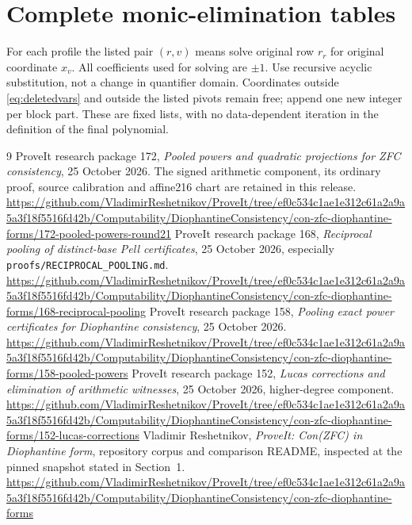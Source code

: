 \documentclass[10pt,letterpaper]{article}
\theoremstyle{remark}\newtheorem{remark}[theorem]{Remark}
\begin{document}
\section{Complete monic-elimination tables}\label{app:pivots}
For each profile the listed pair $(r,v)$ means solve original row $r_r$
for original coordinate $x_v$. All coefficients used for solving are
$\pm1$. Use recursive acyclic substitution, not a change in quantifier
domain. Coordinates outside \eqref{eq:deletedvars} and outside the
listed pivots remain free; append one new integer per block part.
These are fixed lists, with no data-dependent iteration in the
definition of the final polynomial.


\begin{thebibliography}{9}
 ProveIt research package 172,
\emph{Pooled powers and quadratic projections for ZFC consistency},
25 October 2026. The signed arithmetic component, its ordinary proof,
source calibration and affine216 chart are retained in this release.
\url{https://github.com/VladimirReshetnikov/ProveIt/tree/ef0c534c1ae1e312c61a2a9a5a3f18f5516fd42b/Computability/DiophantineConsistency/con-zfc-diophantine-forms/172-pooled-powers-round21}
 ProveIt research package 168,
\emph{Reciprocal pooling of distinct-base Pell certificates},
25 October 2026, especially \texttt{proofs/RECIPROCAL\_POOLING.md}.
\url{https://github.com/VladimirReshetnikov/ProveIt/tree/ef0c534c1ae1e312c61a2a9a5a3f18f5516fd42b/Computability/DiophantineConsistency/con-zfc-diophantine-forms/168-reciprocal-pooling}
 ProveIt research package 158,
\emph{Pooling exact power certificates for Diophantine consistency},
25 October 2026.
\url{https://github.com/VladimirReshetnikov/ProveIt/tree/ef0c534c1ae1e312c61a2a9a5a3f18f5516fd42b/Computability/DiophantineConsistency/con-zfc-diophantine-forms/158-pooled-powers}
 ProveIt research package 152,
\emph{Lucas corrections and elimination of arithmetic witnesses},
25 October 2026, higher-degree component.
\url{https://github.com/VladimirReshetnikov/ProveIt/tree/ef0c534c1ae1e312c61a2a9a5a3f18f5516fd42b/Computability/DiophantineConsistency/con-zfc-diophantine-forms/152-lucas-corrections}
 Vladimir Reshetnikov, \emph{ProveIt: Con(ZFC) in
Diophantine form}, repository corpus and comparison README, inspected
at the pinned snapshot stated in Section~1.
\url{https://github.com/VladimirReshetnikov/ProveIt/tree/ef0c534c1ae1e312c61a2a9a5a3f18f5516fd42b/Computability/DiophantineConsistency/con-zfc-diophantine-forms}
\end{thebibliography}
\end{document}
